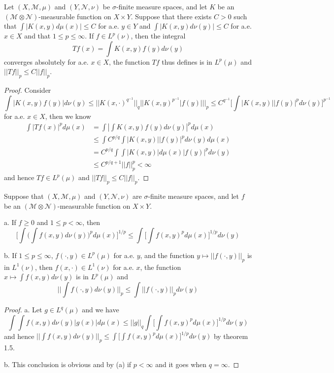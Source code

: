 \documentclass[lang=en, color=blue, ]{elegantbook}
\newcommand{\M}{\mathcal{M}}
\begin{document}
\begin{theorem}
    Let $(X,\M,\mu)$ and $(Y,\mathcal{N},\nu)$ be $\sigma$-finite measure spaces, and let $K$ be an $(\M\otimes\mathcal{N})$-measurable function on $X\times Y$. Suppose that there exists $C>0$ such that $\int |K(x,y)d\mu(x)| \leq C$ for a.e. $y\in Y$ and $\int|K(x,y)d\nu(y)| \leq C$ for a.e. $x\in X$ and that $1\leq p \leq \infty$. If $f\in L^p(\nu)$, then the integral
    \[Tf(x) = \int K(x,y)f(y)d\nu(y)\]
    converges absolutely for a.e. $x\in X$, the function $Tf$ thus defines is in $L^p(\mu)$ and $||Tf||_p \leq C||f||_p$.
\end{theorem}
\begin{proof}
    Consider
    \[
    \int |K(x,y)f(y)|d\nu(y) \leq ||K(x,\cdot)^{q^{-1}}||_q||K(x,y)^{p^{-1}}|f(y)|||_p \leq C^{q^{-1}}\Big[\int |K(x,y)||f(y)|^p d\nu(y)\Big]^{p^{-1}}
    \]
    for a.e. $x\in X$, then we know
    \[
    \begin{aligned}
        \int |Tf(x)|^p d\mu(x) &= \int |\int K(x,y)f(y)d\nu(y)|^p d\mu(x) \\ 
        &\leq \int C^{p/q}\int |K(x,y)||f(y)|^p d\nu(y)d\mu(x) \\ &= C^{p/q} \int \int |K(x,y)|d\mu(x)|f(y)|^p d\nu(y) \\ &\leq C^{p/q+1} ||f||_p^p <\infty
    \end{aligned}
    \]
    and hence $Tf \in L^p(\mu)$ and $||Tf||_p \leq C||f||_p$.
\end{proof}

\begin{theorem}
    Suppose that $(X,\M,\mu)$ and $(Y,\mathcal{N},\nu)$ are $\sigma$-finite measure spaces, and let $f$ be an $(\M\otimes\mathcal{N})$-measurable function on $X\times Y$.\par
    a. If $f\geq 0$ and $1\leq p < \infty$, then
    \[\Big[\int\Big(\int f(x,y)d\nu(y)\Big)^p d\mu(x)\Big]^{1/p} \leq \int\Big[\int f(x,y)^pd\mu(x)\Big]^{1/p} d\nu(y)\]\par
    b. If $1\leq p \leq \infty$, $f(\cdot,y) \in L^p(\mu)$ for a.e. $y$, and the function $y\mapsto ||f(\cdot,y)||_p$ is in $L^1(\nu)$, then $f(x,\cdot) \in L^1(\nu)$ for a.e. $x$, the function $x\mapsto \int f(x,y)d\nu(y)$ is in $L^p(\mu)$ and
    \[||\int f(\cdot,y)d\nu(y)||_p \leq \int||f(\cdot,y)||_p d\nu(y)\]
\end{theorem}
\begin{proof}\par
    a. Let $g\in L^q(\mu)$ and we have
    \[
    \int \int f(x,y)d\nu(y)|g(x)| d\mu(x) \leq ||g||_q\int\Big[\int f(x,y)^p d\mu(x)\Big]^{1/p}d\nu(y)
    \]
    and hence $||\int f(x,y)d\nu(y)||_p \leq \int\Big[\int f(x,y)^p d\mu(x)\Big]^{1/p}d\nu(y)$ by theorem 1.5.\par
    b. This conclusion is obvious and by (a) if $p<\infty$ and it goes when $q = \infty$.
\end{proof}
\end{document}
